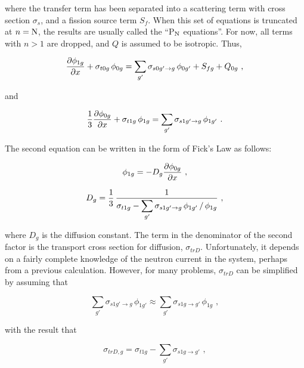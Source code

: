 \noindent
where the transfer term has been separated into a scattering term with
cross section $\sigma_s$, and a fission source term $S_f$.  When this set
of equations is truncated at $n={\rm N} $, the results are usually called
the ``P$_{\rm N}$ equations''.  For now, all terms with $n>1$ are dropped,
and $Q$ is assumed to be isotropic.  Thus,

  \begin{equation}
    {{\partial\phi_{1g}}\over{\partial x}}
    +\sigma_{t0g}\,\phi_{0g}
    =\sum_{g'}\sigma_{s0g'\rightarrow g}\,\phi_{0g'}
    +S_{fg}+Q_{0g}\,\,,
  \label{Eq47}
  \end{equation}

\noindent
and

  \begin{equation}
    {1\over 3}{{\partial\phi_{0g}}\over{\partial x}}
    +\sigma_{t1g}\,\phi_{1g}
    =\sum_{g'}\sigma_{s1g'\rightarrow g}\,\phi_{1g'}\,\,.
  \end{equation}

\noindent
The second equation can be written in the form of Fick's Law as follows:

  \begin{equation}
    \phi_{1g}=-D_g{{\partial\phi_{0g}}\over{\partial x}}\,\,,
  \end{equation}

  \begin{equation}
    D_g={1\over 3}\,{1\over\displaystyle{
    \sigma_{t1g}-{\displaystyle{\sum_{g'}\sigma_{s1g'\rightarrow g}
    \,\phi_{1g'}}\, / \,\displaystyle{\phi_{1g}}}}}\,\,,
  \label{Eq50}
  \end{equation}

\noindent
where $D_g$ is the diffusion constant.  The term in the denominator of
the second factor is the transport cross section for diffusion,
$\sigma_{trD}$.  Unfortunately, it depends on a fairly complete knowledge
of the neutron current in the system, perhaps from a previous calculation.
However, for many problems, $\sigma_{trD}$ can be simplified by assuming that

  \begin{equation}
    \sum_{g'}\sigma_{s1g'\rightarrow g}\,\phi_{1g'}\approx
    \sum_{g'}\sigma_{s1g\rightarrow g'}\,\phi_{1g}\,\,,
  \end{equation}

\noindent
with the result that

  \begin{equation}
    \sigma_{trD,g}=\sigma_{t1g}-\sum_{g'}\sigma_{s1g\rightarrow g'}\,\,,
  \label{Eq52}
  \end{equation}

